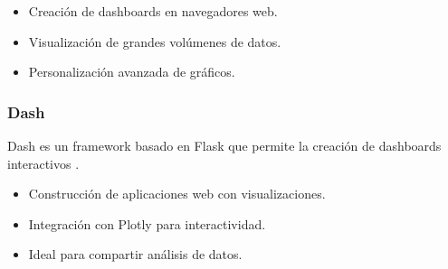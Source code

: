 \begin{itemize}
	\item Creación de dashboards en navegadores web.
	\item Visualización de grandes volúmenes de datos.
	\item Personalización avanzada de gráficos.
\end{itemize}

\subsubsection{Dash}
Dash es un framework basado en Flask que permite la creación de dashboards interactivos \cite{plotly2017dash}.

\begin{itemize}
	\item Construcción de aplicaciones web con visualizaciones.
	\item Integración con Plotly para interactividad.
	\item Ideal para compartir análisis de datos.
\end{itemize}

